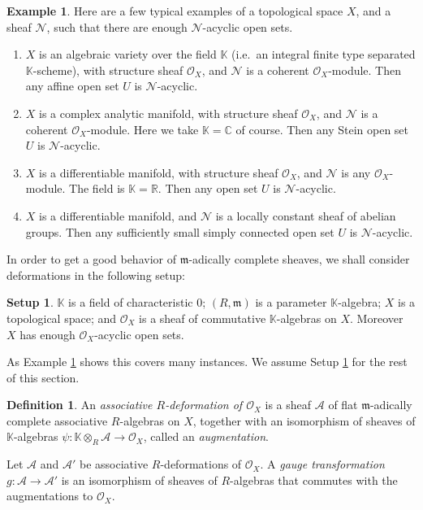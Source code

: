 \documentclass[a4paper, 10pt]{amsart}
\theoremstyle{definition}
\newtheorem{dfn}[equation]{Definition}
\newtheorem{exa}[equation]{Example}
\newtheorem{setup}[equation]{Setup}
\numberwithin{equation}{section}
\newcommand{\mfrak}[1]{\mathfrak{#1}}
\newcommand{\mcal}[1]{\mathcal{#1}}
\newcommand{\mbb}[1]{\mathbb{#1}}
\newcommand{\K}{\mbb{K}}
\newcommand{\m}{\mfrak{m}}
\begin{document}
\begin{exa} \label{exa:20}
Here are a few typical examples of a topological space $X$, and a
sheaf $\mcal{N}$, such that there are enough $\mcal{N}$-acyclic 
open sets.
\begin{enumerate}
\item $X$ is an algebraic variety over the field $\K$
(i.e.\ an integral finite type separated  $\K$-scheme), with structure
sheaf $\mcal{O}_X$, and $\mcal{N}$ is a coherent $\mcal{O}_X$-module.
Then any affine open set $U$ is $\mcal{N}$-acyclic.
%
\item $X$ is a complex analytic manifold, with structure sheaf 
$\mcal{O}_X$, and $\mcal{N}$ is a coherent $\mcal{O}_X$-module. 
Here we take $\K = \mbb{C}$ of course. Then
any Stein open set $U$ is $\mcal{N}$-acyclic.
%
\item $X$ is a differentiable manifold, with structure
sheaf $\mcal{O}_X$, and $\mcal{N}$ is any $\mcal{O}_X$-module. 
The field is $\K = \mbb{R}$. Then
any open set $U$ is $\mcal{N}$-acyclic.
%
\item $X$ is a differentiable manifold, and $\mcal{N}$ is a locally
constant sheaf of abelian groups. Then any sufficiently small
simply connected open set $U$ is $\mcal{N}$-acyclic. 
\end{enumerate}
\end{exa}

In order to get a good behavior of $\m$-adically complete sheaves, we shall
consider deformations in the following setup:

\begin{setup} \label{setup:200}
$\K$ is a field of characteristic $0$;
$(R, \m)$ is a parameter $\K$-algebra; $X$ is a topological
space; and $\mcal{O}_X$ is a sheaf of commutative $\K$-algebras on $X$. 
Moreover $X$ has enough $\mcal{O}_X$-acyclic open sets.
\end{setup}

As Example \ref{exa:20} shows this covers many instances.
We assume Setup \ref{setup:200} for the rest of this section.

\begin{dfn} \label{dfn:230}
An {\em associative $R$-deformation of $\mcal{O}_X$} is a sheaf
$\mcal{A}$ of flat $\m$-adically complete associative
$R$-algebras on $X$, together with an isomorphism of
sheaves of $\K$-algebras
$\psi : \K \otimes_R \mcal{A} \to \mcal{O}_X$, called an {\em augmentation}.

Let $\mcal{A}$ and $\mcal{A}'$ be associative $R$-deformations of
$\mcal{O}_X$. A {\em gauge transformation}
$g : \mcal{A} \to \mcal{A}'$
is an isomorphism of sheaves of $R$-algebras that commutes with
the augmentations to $\mcal{O}_X$.
\end{dfn}
\end{document}
